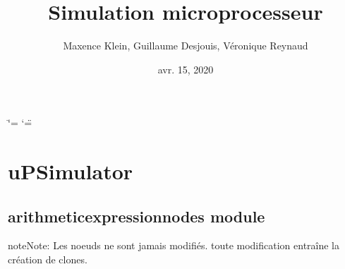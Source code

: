 \documentclass[letterpaper,10pt,french]{sphinxmanual}
\title{Simulation microprocesseur}
\date{avr. 15, 2020}
\author{Maxence Klein, Guillaume Desjouis, Véronique Reynaud}
\begin{document}
\ifdefined\shorthandoff
  \ifnum\catcode`\=\string=\active\shorthandoff{=}\fi
  \ifnum\catcode`\"=\active{}\fi
\fi

\pagestyle{empty}
\sphinxmaketitle
\pagestyle{plain}
\sphinxtableofcontents
\pagestyle{normal}
\label{\detokenize{index::doc}}



\chapter{uPSimulator}
\label{\detokenize{modules:upsimulator}}\label{\detokenize{modules::doc}}

\section{arithmeticexpressionnodes module}
\label{\detokenize{arithmeticexpressionnodes:module-arithmeticexpressionnodes}}\label{\detokenize{arithmeticexpressionnodes:arithmeticexpressionnodes-module}}\label{\detokenize{arithmeticexpressionnodes::doc}}\label{\detokenize{arithmeticexpressionnodes:module-arithmeticexpressionnodes}}
\begin{sphinxadmonition}{note}{Note:}
Les noeuds ne sont jamais modifiés. toute modification entraîne la création de clones.
\end{sphinxadmonition}
\end{document}
